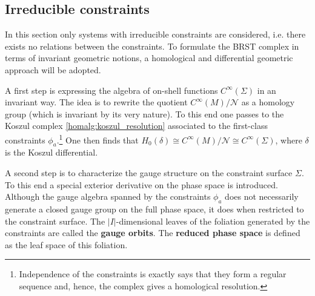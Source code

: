 \subsection{Irreducible constraints}

    In this section only systems with irreducible constraints are considered, i.e. there exists no relations between the constraints. To formulate the BRST complex in terms of invariant geometric notions, a homological and differential geometric approach will be adopted.

    A first step is expressing the algebra of on-shell functions $C^\infty(\Sigma)$ in an invariant way. The idea is to rewrite the quotient $C^\infty(M)/\mathcal{N}$ as a homology group (which is invariant by its very nature). To this end one passes to the Koszul complex \ref{homalg:koszul_resolution} associated to the first-class constraints $\phi_a$.\footnote{Independence of the constraints is exactly says that they form a regular sequence and, hence, the complex gives a homological resolution.} One then finds that $H_0(\delta)\cong C^\infty(M)/\mathcal{N}\cong C^\infty(\Sigma)$, where $\delta$ is the Koszul differential.

    A second step is to characterize the gauge structure on the constraint surface $\Sigma$. To this end a special exterior derivative on the phase space is introduced. Although the gauge algebra spanned by the constraints $\phi_a$ does not necessarily generate a closed gauge group on the full phase space, it does when restricted to the constraint surface. The $|I|$-dimensional leaves of the foliation generated by the constraints are called the \textbf{gauge orbits}. The \textbf{reduced phase space} is defined as the leaf space of this foliation.

